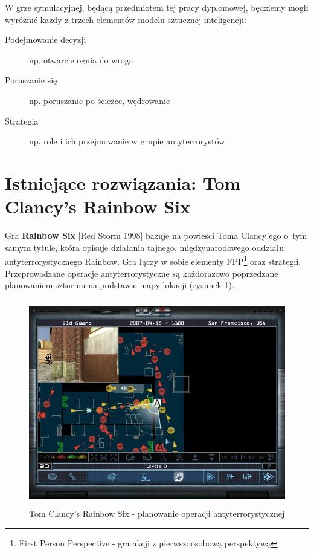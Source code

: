 W grze symulacyjnej, będącą przedmiotem tej pracy dyplomowej, będziemy mogli wyróżnić każdy z trzech elementów modelu sztucznej inteligencji:
\begin{description}
	\item[Podejmowanie decyzji] np. otwarcie ognia do wroga
	\item[Poruszanie się] np. poruszanie po ścieżce, wędrowanie
	\item[Strategia] np. role i ich przejmowanie w grupie antyterrorystów
\end{description}

\section{Istniejące rozwiązania: Tom Clancy's Rainbow Six}

Gra \textbf{Rainbow Six} [Red Storm 1998] bazuje na powieści Toma Clancy'ego o~tym samym tytule, która opisuje działania tajnego, międzynarodowego oddziału antyterrorystycznego Rainbow. Gra łączy w sobie elementy FPP\footnote{First Person Perspective - gra akcji z pierwszoosobową perspektywą} oraz strategii. Przeprowadzane operacje antyterrorystyczne są każdorazowo poprzedzane planowaniem szturmu na podstawie mapy lokacji (rysunek \ref{rainbowPlan}).

\begin{figure}
\begin{center}
	\includegraphics[width=120mm,height=90mm]{images/planner}
	\caption{Tom Clancy's Rainbow Six - planowanie operacji antyterrorystycznej\label{rainbowPlan}}
\end{center}
\end{figure}

